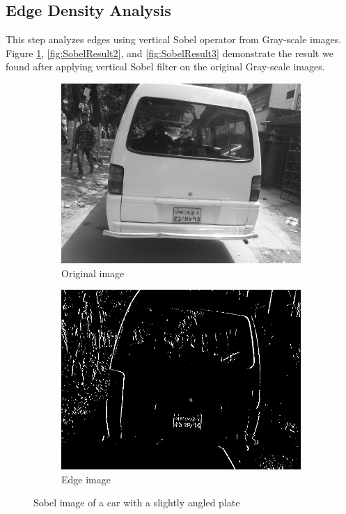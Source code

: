 \subsection{Edge Density Analysis}
This step analyzes edges using vertical Sobel operator from Gray-scale images. Figure \ref{fig:SobelResult1}, \ref{fig:SobelResult2}, and \ref{fig:SobelResult3} demonstrate the result we found after applying vertical Sobel filter on the original Gray-scale images.

\begin{figure}
\begin{subfigure}{0.5\textwidth}
    \centering
    \includegraphics[width=0.9\linewidth]{./img/experiment/stage.2/angle}
    \caption{Original image}
\end{subfigure}
\begin{subfigure}{0.5\textwidth}
    \centering
    \includegraphics[width=0.9\linewidth]{./img/experiment/stage.3/angle}
    \caption{Edge image}
\end{subfigure}
\caption{Sobel image of a car with a slightly angled plate}
\label{fig:SobelResult1}
\end{figure}

